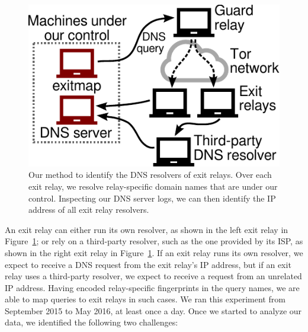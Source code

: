 \begin{figure}[t]
	\centering
	\includegraphics[width=0.6\linewidth]{figures/resolver-identification.pdf}
	\caption{Our method to identify the DNS resolvers of exit relays.  Over
	each exit relay, we resolve relay-specific domain names that are under our
	control.  Inspecting our DNS server logs, we can then identify the IP
	address of all exit relay resolvers.}
	\label{fig:dnsenum}
\end{figure}

An exit relay can either run its own resolver, as shown in the left exit relay in
Figure~\ref{fig:dnsenum}; or rely on a third-party resolver, such as the one
provided by its ISP, as shown in the right exit relay in Figure~\ref{fig:dnsenum}.  If
an exit relay runs its own resolver, we expect to receive a DNS request from
the exit relay's IP address, but if an exit relay uses a third-party resolver,
we expect to receive a request from an unrelated IP address.  Having encoded
relay-specific fingerprints in the query names, we are able to map queries to
exit relays in such cases.  We ran this experiment from September 2015 to May
2016, at least once a day.  Once we started to analyze our data, we identified
the following two challenges:

